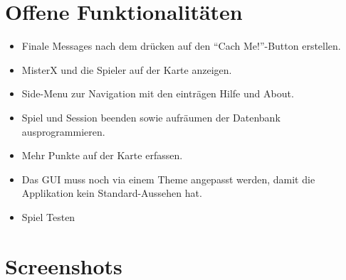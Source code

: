 \documentclass[11pt]{article}
\begin{document}
\section{Offene Funktionalitäten}
\begin{itemize}
\item Finale Messages nach dem drücken auf den ``Cach Me!''-Button erstellen.
\item MisterX und die Spieler auf der Karte anzeigen.
\item Side-Menu zur Navigation mit den einträgen Hilfe und About.
\item Spiel und Session beenden sowie aufräumen der Datenbank ausprogrammieren.
\item Mehr Punkte auf der Karte erfassen.
\item Das GUI muss noch via einem Theme angepasst werden, damit die Applikation kein Standard-Aussehen hat.
\item Spiel Testen
\end{itemize}
 

\section{Screenshots}
\end{document}
